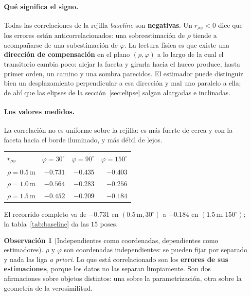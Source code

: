 \documentclass[11pt,a4paper]{article}
\theoremstyle{definition}
\newtheorem{obs}{Observación}
\theoremstyle{plain}
\begin{document}
\paragraph{Qué significa el signo.}
Todas las correlaciones de la rejilla \emph{baseline} son \textbf{negativas}. Un
$r_{\rho\varphi}<0$ dice que los errores están anticorrelacionados: una
sobreestimación de $\rho$ tiende a acompañarse de una subestimación de
$\varphi$. La lectura física es que existe una \textbf{dirección de
compensación} en el plano $(\rho,\varphi)$ a lo largo de la cual el transitorio
cambia poco: alejar la faceta y girarla hacia el hueco produce, hasta primer
orden, un camino y una sombra parecidos. El estimador puede distinguir bien un
desplazamiento perpendicular a esa dirección y mal uno paralelo a ella; de ahí
que las elipses de la sección~\ref{sec:elipse} salgan alargadas e inclinadas.

\paragraph{Los valores medidos.}
La correlación no es uniforme sobre la rejilla: es más fuerte de cerca y con la
faceta hacia el borde iluminado, y más débil de lejos.
%
\begin{center}
\begin{tabular}{@{}lrrr@{}}
\toprule
$r_{\rho\varphi}$ & $\varphi=30^\circ$ & $\varphi=90^\circ$ & $\varphi=150^\circ$ \\
\midrule
$\rho=0.5\,$m & $-0.731$ & $-0.435$ & $-0.403$ \\
$\rho=1.0\,$m & $-0.564$ & $-0.283$ & $-0.256$ \\
$\rho=1.5\,$m & $-0.452$ & $-0.209$ & $-0.184$ \\
\bottomrule
\end{tabular}
\end{center}
%
El recorrido completo va de $-0.731$ en $(0.5\,\text{m},30^\circ)$ a $-0.184$ en
$(1.5\,\text{m},150^\circ)$; la tabla~\ref{tab:baseline} da las $15$ poses.

\begin{obs}[Independientes como coordenadas, dependientes como estimadores]
\label{obs:indep}
$\rho$ y $\varphi$ son coordenadas independientes: se pueden fijar por separado
y nada las liga \emph{a priori}. Lo que está correlacionado son los
\textbf{errores de sus estimaciones}, porque los datos no las separan
limpiamente. Son dos afirmaciones sobre objetos distintos: una sobre la
parametrización, otra sobre la geometría de la verosimilitud.
\end{obs}
\end{document}
